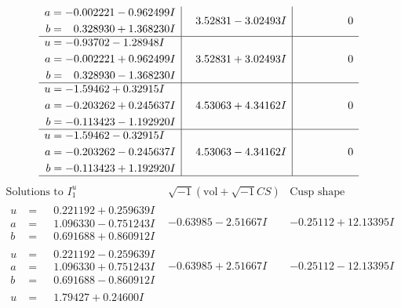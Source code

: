 \documentclass[1p]{elsarticle_modified}
\theoremstyle{definition}
\newcommand{\I}{\sqrt{-1}}
\begin{document}
$$\begin{array}{c|c|c}
\begin{aligned}
a &= -0.002221 - 0.962499 I \\
b &= \phantom{-}0.328930 + 1.368230 I\end{aligned}
 & \phantom{-}3.52831 - 3.02493 I & \phantom{-0.000000 } 0 \\ \hline\begin{aligned}
u &= -0.93702 - 1.28948 I \\
a &= -0.002221 + 0.962499 I \\
b &= \phantom{-}0.328930 - 1.368230 I\end{aligned}
 & \phantom{-}3.52831 + 3.02493 I & \phantom{-0.000000 } 0 \\ \hline\begin{aligned}
u &= -1.59462 + 0.32915 I \\
a &= -0.203262 + 0.245637 I \\
b &= -0.113423 - 1.192920 I\end{aligned}
 & \phantom{-}4.53063 + 4.34162 I & \phantom{-0.000000 } 0 \\ \hline\begin{aligned}
u &= -1.59462 - 0.32915 I \\
a &= -0.203262 - 0.245637 I \\
b &= -0.113423 + 1.192920 I\end{aligned}
 & \phantom{-}4.53063 - 4.34162 I & \phantom{-0.000000 } 0\\
 \hline 
 \end{array}$$\newpage$$\begin{array}{c|c|c}  
\text{Solutions to }I^u_{1}& \I (\text{vol} + \sqrt{-1}CS) & \text{Cusp shape}\\
 \hline 
\begin{aligned}
u &= \phantom{-}0.221192 + 0.259639 I \\
a &= \phantom{-}1.096330 - 0.751243 I \\
b &= \phantom{-}0.691688 + 0.860912 I\end{aligned}
 & -0.63985 - 2.51667 I & -0.25112 + 12.13395 I \\ \hline\begin{aligned}
u &= \phantom{-}0.221192 - 0.259639 I \\
a &= \phantom{-}1.096330 + 0.751243 I \\
b &= \phantom{-}0.691688 - 0.860912 I\end{aligned}
 & -0.63985 + 2.51667 I & -0.25112 - 12.13395 I \\ \hline\begin{aligned}
u &= \phantom{-}1.79427 + 0.24600 I \\

\end{aligned}
\end{array}$$
\end{document}
